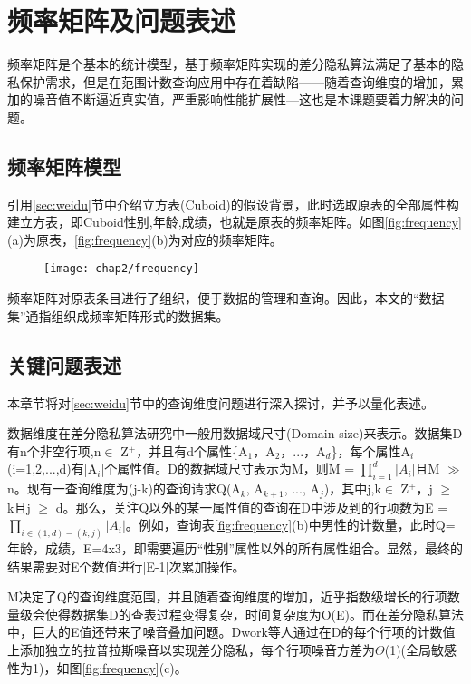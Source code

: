 \section{频率矩阵及问题表述}

频率矩阵是个基本的统计模型，基于频率矩阵实现的差分隐私算法满足了基本的隐私保护需求，但是在范围计数查询应用中存在着缺陷——随着查询维度的增加，累加的噪音值不断逼近真实值，严重影响性能扩展性---这也是本课题要着力解决的问题。

\subsection{频率矩阵模型}

引用\ref{sec:weidu}节中介绍立方表(Cuboid)的假设背景，此时选取原表的全部属性构建立方表，即Cuboid{性别,年龄,成绩}，也就是原表的频率矩阵。如图\ref{fig:frequency}(a)为原表，\ref{fig:frequency}(b)为对应的频率矩阵。

\begin{figure}[!htp]
	\centering
	\texttt{[image: chap2/frequency]}
\end{figure}

频率矩阵对原表条目进行了组织，便于数据的管理和查询。因此，本文的“数据集”通指组织成频率矩阵形式的数据集。

\subsection{关键问题表述}

本章节将对\ref{sec:weidu}节中的查询维度问题进行深入探讨，并予以量化表述。

数据维度在差分隐私算法研究中一般用数据域尺寸(Domain size)来表示。数据集D有n个非空行项,n$\in$ Z$^{+}$，并且有d个属性\{A$_{1}$，A$_{2}$，...，A$_{d}$\}，每个属性A$_{i}$(i=1,2,...,d)有|A$_{i}$|个属性值。D的数据域尺寸表示为M，则M = \(\prod\limits_{i = 1}^d {|A{_i} |}\)且M $\gg$ n。现有一查询维度为(j-k)的查询请求Q(A$_{k}$, A$_{k+1}$, ..., A$_{j}$)，其中j,k$\in$ Z$^{+}$，j $\geqslant$ k且j $\geqslant$ d。那么，关注Q以外的某一属性值的查询在D中涉及到的行项数为E = \(\prod\nolimits_{i \in (1,d) - (k,j)} {|A{_i} |} \)。例如，查询表\ref{fig:frequency}(b)中男性的计数量，此时Q={年龄，成绩}，E=4x3，即需要遍历“性别”属性以外的所有属性组合。显然，最终的结果需要对E个数值进行|E-1|次累加操作。

M决定了Q的查询维度范围，并且随着查询维度的增加，近乎指数级增长的行项数量级会使得数据集D的查表过程变得复杂，时间复杂度为O(E)。而在差分隐私算法中，巨大的E值还带来了噪音叠加问题。Dwork\cite{Dwork Calibrating}等人通过在D的每个行项的计数值上添加独立的拉普拉斯噪音以实现差分隐私，每个行项噪音方差为$\Theta$(1)(全局敏感性为1)，如图\ref{fig:frequency}(c)。

